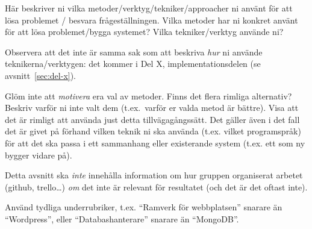 Här beskriver ni vilka metoder/verktyg/tekniker/approacher ni använt för att lösa problemet / besvara frågeställningen.  Vilka metoder har ni konkret använt för att lösa problemet/bygga systemet?  Vilka tekniker/verktyg använde ni?

Observera att det inte är samma sak som att beskriva \emph{hur} ni använde teknikerna/verktygen: det kommer i Del X, implementationsdelen (se avsnitt~\ref{sec:del-x}).

Glöm inte att \emph{motivera} era val av metoder. Finns det flera rimliga alternativ? Beskriv varför ni inte valt dem (t.ex.~varför er valda metod är bättre).
Visa att det är rimligt att använda just detta tillvägagångssätt.
Det gäller även i det fall det är givet på förhand vilken teknik ni ska använda (t.ex. vilket programspråk) för att det ska passa i ett sammanhang eller existerande system (t.ex. ett som ny bygger vidare på). 

Detta avsnitt ska \emph{inte} innehålla information om hur gruppen organiserat arbetet (github, trello\ldots) \emph{om} det inte är relevant för resultatet (och det är det oftast inte).

Använd tydliga underrubriker, t.ex. ``Ramverk för webbplatsen'' snarare än ``Wordpress'', eller ``Databashanterare'' snarare än ``MongoDB''.

